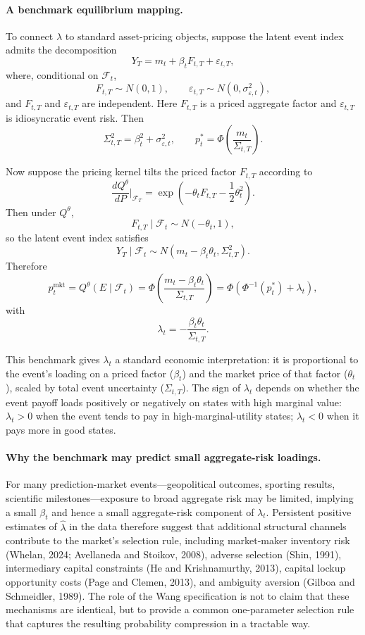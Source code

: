 \documentclass[12pt,a4paper]{article}
\begin{document}
\paragraph{A benchmark equilibrium mapping.}
To connect $\lambda$ to standard asset-pricing objects, suppose the latent event index admits the decomposition
\[
Y_T = m_t + \beta_t F_{t,T} + \varepsilon_{t,T},
\]
where, conditional on $\mathcal F_t$,
\[
F_{t,T}\sim N(0,1), \qquad \varepsilon_{t,T}\sim N(0,\sigma_{\varepsilon,t}^2),
\]
and $F_{t,T}$ and $\varepsilon_{t,T}$ are independent. Here $F_{t,T}$ is a priced aggregate factor and $\varepsilon_{t,T}$ is idiosyncratic event risk. Then
\[
\Sigma_{t,T}^2 = \beta_t^2 + \sigma_{\varepsilon,t}^2,
\qquad
p_t^* = \Phi\!\left(\frac{m_t}{\Sigma_{t,T}}\right).
\]

Now suppose the pricing kernel tilts the priced factor $F_{t,T}$ according to
\[
\frac{dQ^\theta}{dP}\Big|_{\mathcal F_T}
=
\exp\!\left(-\theta_t F_{t,T}-\frac12\theta_t^2\right).
\]
Then under $Q^\theta$,
\[
F_{t,T}\mid\mathcal F_t \sim N(-\theta_t,1),
\]
so the latent event index satisfies
\[
Y_T\mid\mathcal F_t \sim N(m_t-\beta_t\theta_t,\Sigma_{t,T}^2).
\]
Therefore
\[
p_t^{\mathrm{mkt}}
=
Q^\theta(E\mid\mathcal F_t)
=
\Phi\!\left(\frac{m_t-\beta_t\theta_t}{\Sigma_{t,T}}\right)
=
\Phi\!\left(\Phi^{-1}(p_t^*)+\lambda_t\right),
\]
with
\begin{equation}
\lambda_t = -\frac{\beta_t\theta_t}{\Sigma_{t,T}}.
\tag{2}
\end{equation}

This benchmark gives $\lambda_t$ a standard economic interpretation: it is proportional to the event's loading on a priced factor ($\beta_t$) and the market price of that factor ($\theta_t$), scaled by total event uncertainty ($\Sigma_{t,T}$). The sign of $\lambda_t$ depends on whether the event payoff loads positively or negatively on states with high marginal value: $\lambda_t>0$ when the event tends to pay in high-marginal-utility states; $\lambda_t<0$ when it pays more in good states.

\paragraph{Why the benchmark may predict small aggregate-risk loadings.}
For many prediction-market events---geopolitical outcomes, sporting results, scientific milestones---exposure to broad aggregate risk may be limited, implying a small $\beta_t$ and hence a small aggregate-risk component of $\lambda_t$. Persistent positive estimates of $\hat\lambda$ in the data therefore suggest that additional structural channels contribute to the market's selection rule, including market-maker inventory risk (Whelan, 2024; Avellaneda and Stoikov, 2008), adverse selection (Shin, 1991), intermediary capital constraints (He and Krishnamurthy, 2013), capital lockup opportunity costs (Page and Clemen, 2013), and ambiguity aversion (Gilboa and Schmeidler, 1989). The role of the Wang specification is not to claim that these mechanisms are identical, but to provide a common one-parameter selection rule that captures the resulting probability compression in a tractable way.
\end{document}
